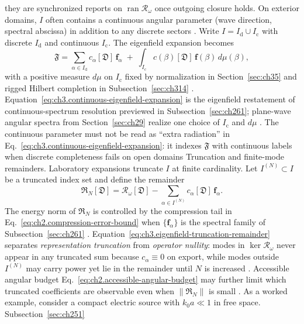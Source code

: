 they are synchronized reports on \(\operatorname{ran}\mathcal{R}_\omega\) once outgoing closure holds.
On exterior domains, \(I\) often contains a continuous angular parameter (wave direction, spectral
abscissa) in addition to any discrete sectors . Write
\(I=I_{\mathrm{d}}\cup I_{\mathrm{c}}\) with discrete \(I_{\mathrm{d}}\) and continuous
\(I_{\mathrm{c}}\). The eigenfield expansion becomes
\begin{equation}
\label{eq:ch3.continuous-eigenfield-expansion}
\mathfrak{F}
=
\sum_{\alpha\in I_{\mathrm{d}}} c_\alpha[\mathfrak{D}]\,\mathbf{f}_\alpha
\;+\;
\int_{I_{\mathrm{c}}} c(\beta)[\mathfrak{D}]\,\mathbf{f}(\beta)\,d\mu(\beta),
\end{equation}
with a positive measure \(d\mu\) on \(I_{\mathrm{c}}\) fixed by normalization in
Section~\ref{sec:ch35} and rigged Hilbert completion in Subsection~\ref{sec:ch314}
. Equation~\eqref{eq:ch3.continuous-eigenfield-expansion} is the
eigenfield restatement of continuous-spectrum resolution previewed in Subsection~\ref{sec:ch261};
plane-wave angular spectra from Section~\ref{sec:ch29} realize one choice of
\(I_{\mathrm{c}}\) and \(d\mu\) . The continuous parameter must not be read as
``extra radiation'' in Eq.~\eqref{eq:ch3.continuous-eigenfield-expansion}: it indexes
\(\mathfrak{F}\) with continuous labels when discrete completeness fails on open domains
Truncation and finite-mode remainders. Laboratory expansions truncate \(I\) at finite cardinality. Let \(I^{(N)}\subset I\) be a
truncated index set and define the remainder
\begin{equation}
\label{eq:ch3.eigenfield-truncation-remainder}
\mathfrak{R}_N[\mathfrak{D}]
=
\mathcal{R}_\omega[\mathfrak{D}]
-
\sum_{\alpha\in I^{(N)}} c_\alpha[\mathfrak{D}]\,\mathbf{f}_\alpha.
\end{equation}
The energy norm of \(\mathfrak{R}_N\) is controlled by the compression tail in
Eq.~\eqref{eq:ch2.compression-error-bound} when \(\{\mathbf{f}_\alpha\}\) is the spectral family of
Subsection~\ref{sec:ch261} . Equation~\eqref{eq:ch3.eigenfield-truncation-remainder}
separates \emph{representation truncation} from \emph{operator nullity}: modes in
\(\ker\mathcal{R}_\omega\) never appear in any truncated sum because \(c_\alpha\equiv 0\) on export,
while modes outside \(I^{(N)}\) may carry power yet lie in the remainder until \(N\) is increased
. Accessible angular budget
Eq.~\eqref{eq:ch2.accessible-angular-budget} may further limit which truncated coefficients are
observable even when \(\|\mathfrak{R}_N\|\) is small .
As a worked example, consider a compact electric source with \(k_0 a\ll 1\) in free space. Subsection~\ref{sec:ch251}
